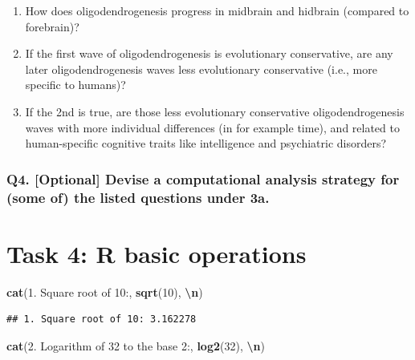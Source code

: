 \documentclass[
]{article}
\newenvironment{Shaded}{\begin{snugshade}}{\end{snugshade}}
\newcommand{\DecValTok}[1]{\textcolor[rgb]{0.00,0.00,0.81}{#1}}
\newcommand{\FunctionTok}[1]{\textcolor[rgb]{0.13,0.29,0.53}{\textbf{#1}}}
\newcommand{\NormalTok}[1]{#1}
\newcommand{\SpecialCharTok}[1]{\textcolor[rgb]{0.81,0.36,0.00}{\textbf{#1}}}
\newcommand{\StringTok}[1]{\textcolor[rgb]{0.31,0.60,0.02}{#1}}
\providecommand{\tightlist}{%
  \setlength{\itemsep}{0pt}\setlength{\parskip}{0pt}}
\begin{document}
\begin{enumerate}
\def\labelenumi{\arabic{enumi}.}
\tightlist
\item
  How does oligodendrogenesis progress in midbrain and hidbrain
  (compared to forebrain)?
\item
  If the first wave of oligodendrogenesis is evolutionary conservative,
  are any later oligodendrogenesis waves less evolutionary conservative
  (i.e., more specific to humans)?
\item
  If the 2nd is true, are those less evolutionary conservative
  oligodendrogenesis waves with more individual differences (in for
  example time), and related to human-specific cognitive traits like
  intelligence and psychiatric disorders?
\end{enumerate}

\subsubsection{Q4. {[}Optional{]} Devise a computational analysis
strategy for (some of) the listed questions under
3a.}\label{q4.-optional-devise-a-computational-analysis-strategy-for-some-of-the-listed-questions-under-3a.}

\section{Task 4: R basic operations}\label{task-4-r-basic-operations}

\begin{Shaded}
\begin{Highlighting}[]
\FunctionTok{cat}\NormalTok{(}\StringTok{\textquotesingle{}1. Square root of 10:\textquotesingle{}}\NormalTok{, }\FunctionTok{sqrt}\NormalTok{(}\DecValTok{10}\NormalTok{), }\StringTok{\textquotesingle{}}\SpecialCharTok{\textbackslash{}n}\StringTok{\textquotesingle{}}\NormalTok{)}
\end{Highlighting}
\end{Shaded}

\begin{verbatim}
## 1. Square root of 10: 3.162278
\end{verbatim}

\begin{Shaded}
\begin{Highlighting}[]
\FunctionTok{cat}\NormalTok{(}\StringTok{\textquotesingle{}2. Logarithm of 32 to the base 2:\textquotesingle{}}\NormalTok{, }\FunctionTok{log2}\NormalTok{(}\DecValTok{32}\NormalTok{), }\StringTok{\textquotesingle{}}\SpecialCharTok{\textbackslash{}n}\StringTok{\textquotesingle{}}\NormalTok{)}
\end{Highlighting}
\end{Shaded}
\end{document}
